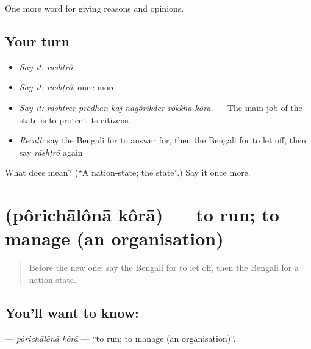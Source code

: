 \begin{grammarlens}[title={What you've built}]
One more word for giving reasons and opinions.
\end{grammarlens}

\subsection*{Your turn}
\begin{itemize}
\raggedright
  \item \emph{Say it:} \emph{rāshṭrô}
  \item \emph{Say it:} \emph{rāshṭrô}, once more
  \item \emph{Say it:} \emph{rāshṭrer prôdhān kāj nāgôrikder rôkkhā kôrā.} — The main job of the state is to protect its citizens.
  \item \emph{Recall:} say the Bengali for to answer for, then the Bengali for to let off, then say \emph{rāshṭrô} again
\end{itemize}

\begin{tcolorbox}[breakable,colback=teal!4,colframe=teal!35!black,title={Before you move on}]
What does  mean? (\textquotedblleft{}A nation-state; the state\textquotedblright{}.) Say it once more.
\end{tcolorbox}
\section[\texorpdfstring{\bn{পরিচালনা} \bn{করা} (pôrichālônā kôrā)}{পরিচালনা করা (pôrichālônā kôrā)}]{  (pôrichālônā kôrā) — to run; to manage (an organisation)}

\label{lesson:BN-C344-porichalona-kora}



\begin{quote}
Before the new one: say the Bengali for to let off, then the Bengali for a nation-state.
\end{quote}

\subsection*{You'll want to know:  }
\textbf{ } — \emph{pôrichālônā kôrā} — \textquotedblleft{}to run; to manage (an organisation)\textquotedblright{}.

\begin{quote}
     
\end{quote}

